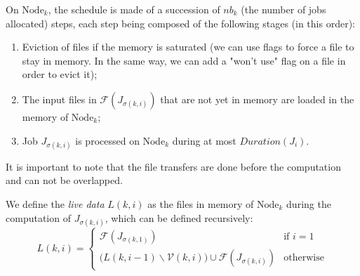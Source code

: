 \documentclass[a4paper]{article}
\newcommand{\Node}[1]{\ensuremath{\mathrm{Node}_{#1}}\xspace}
\newcommand{\inputs}{\ensuremath{\mathcal{F}}\xspace}
\newcommand{\memory}{\ensuremath{\mathcal{M}}\xspace}
\newcommand{\duration}{\mathit{Duration}\xspace}
\newcommand{\jobset}{\ensuremath{\mathbb{J}}\xspace}
\newcommand{\evict}{\ensuremath{\mathcal{V}}\xspace}
\newcommand{\nbloads}{\ensuremath{\mathit{\mathit{Loads}}}\xspace}
\newcommand{\live}{\ensuremath{L}\xspace}
\begin{document}
On $\Node{k}$, the schedule is made of a
succession of $\mathit{nb}_k$ (the number of jobs allocated) steps, each step being composed of the
following stages (in this order):
\begin{enumerate}
\item Eviction of files if the memory is saturated (we can use flags to force a file to stay in memory. In the same way, we can add a "won't use" flag on a file in order to evict it);
\item The input files in $\inputs(J_{\sigma(k,i)})$ that are not yet in memory are loaded in the memory of $\Node{k}$;
\item Job $J_{\sigma(k,i)}$ is processed on $\Node{k}$ during at most $\duration(J_i)$.
\end{enumerate}
It is important to note that the file transfers are done before the computation and can not be overlapped.

We define the \emph{live data} $\live(k,i)$
as the files in memory of $\Node{k}$ during the computation of $J_{\sigma(k,i)}$, which
can be defined recursively:
$$
\live(k,i)=
\begin{cases}
  \inputs(J_{\sigma(k,1)}) & \text{if~}i=1\\
\Big(\live(k,i-1) \backslash \evict(k,i)\Big) \cup \inputs(J_{\sigma(k,i)})
& \text{otherwise}
\end{cases}
$$


\end{document}
